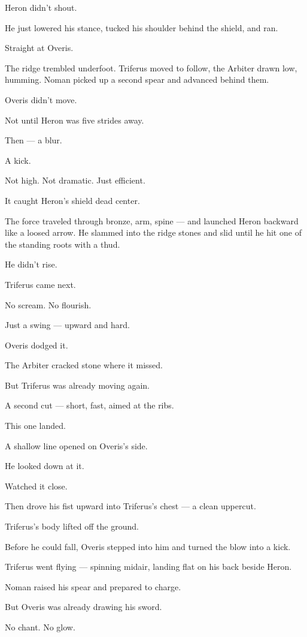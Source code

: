 \documentclass[9pt]{article}
\begin{document}
Heron didn’t shout.

He just lowered his stance, tucked his shoulder behind the shield, and ran.

Straight at Overis.

The ridge trembled underfoot. Triferus moved to follow, the Arbiter drawn low, humming. Noman picked up a second spear and advanced behind them.

Overis didn’t move.

Not until Heron was five strides away.

Then — a blur.

A kick.

Not high. Not dramatic. Just efficient.

It caught Heron’s shield dead center.

The force traveled through bronze, arm, spine — and launched Heron backward like a loosed arrow. He slammed into the ridge stones and slid until he hit one of the standing roots with a thud.

He didn’t rise.

\bigskip

Triferus came next.

No scream. No flourish.

Just a swing — upward and hard.

Overis dodged it.

The Arbiter cracked stone where it missed.

But Triferus was already moving again.

A second cut — short, fast, aimed at the ribs.

This one landed.

A shallow line opened on Overis’s side.

He looked down at it.

Watched it close.

Then drove his fist upward into Triferus’s chest — a clean uppercut.

Triferus’s body lifted off the ground.

Before he could fall, Overis stepped into him and turned the blow into a kick.

Triferus went flying — spinning midair, landing flat on his back beside Heron.

Noman raised his spear and prepared to charge.

But Overis was already drawing his sword.

\bigskip

No chant. No glow.
\end{document}
